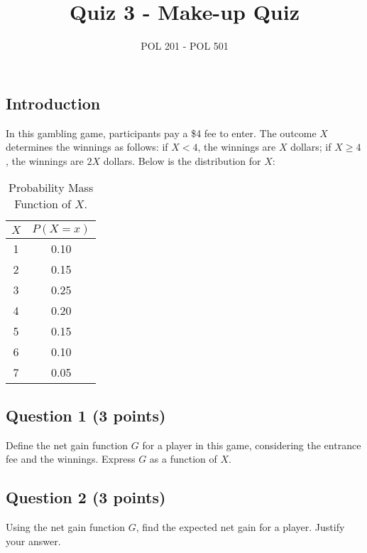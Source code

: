 \documentclass{article}
\title{Quiz 3 - Make-up Quiz}
\author{POL 201 - POL 501}
\date{}
\begin{document}
\maketitle

\subsection*{Introduction}
In this gambling game, participants pay a \$4 fee to enter. The outcome \(X\) determines the winnings as follows: if \(X < 4\), the winnings are \(X\) dollars; if \(X \geq 4\), the winnings are \(2X\) dollars. Below is the distribution for \(X\):

\begin{table}[h!]
\centering
\begin{tabular}{c|c}
    \hline 
    \(X\) & \(P(X = x)\) \\
    \hline
    1 & 0.10 \\
    2 & 0.15 \\
    3 & 0.25 \\
    4 & 0.20 \\
    5 & 0.15 \\
    6 & 0.10 \\
    7 & 0.05 \\
    \hline 
\end{tabular}
\caption{Probability Mass Function of \(X\).}
\end{table}

\subsection*{Question 1 (3 points)}
Define the net gain function \(G\) for a player in this game, considering the entrance fee and the winnings. Express \(G\) as a function of \(X\).

\begin{center}
\end{center}

\subsection*{Question 2 (3 points)}
Using the net gain function \(G\), find the expected net gain for a player. Justify your answer.

\begin{center}
\end{center}
\end{document}
